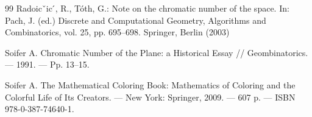\documentclass[12pt]{article}
\begin{document}
\begin{thebibliography}{99}
Radoicˇic ́, R., Tóth, G.: Note on the chromatic number of the space. In: Pach, J. (ed.) Discrete and
Computational Geometry, Algorithms and Combinatorics, vol. 25, pp. 695–698. Springer, Berlin (2003)

Soifer A. Chromatic Number of the Plane: a Historical Essay // Geombinatorics. — 1991. — Pp. 13–15.

Soifer A. The Mathematical Coloring Book: Mathematics of Coloring and the Colorful Life of Its Creators. — New York: Springer, 2009. — 607 p. — ISBN 978-0-387-74640-1.

\end{thebibliography}
\end{document}
